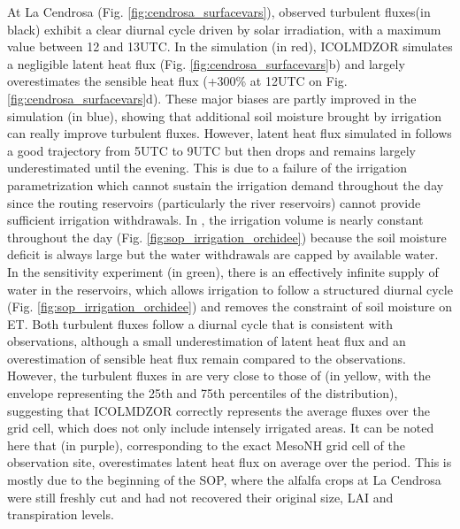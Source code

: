 At La Cendrosa (Fig. \ref{fig:cendrosa_surfacevars}), observed turbulent fluxes(in black) exhibit a clear diurnal cycle driven by solar irradiation, with a maximum value between 12 and 13UTC.
In the \noirr simulation (in red), ICOLMDZOR simulates a negligible latent heat flux (Fig. \ref{fig:cendrosa_surfacevars}b) and largely overestimates the sensible heat flux (+300\% at 12UTC on Fig. \ref{fig:cendrosa_surfacevars}d). 
These major biases are partly improved in the \irr simulation (in blue), showing that additional soil moisture brought by irrigation can really improve turbulent fluxes. However, latent heat flux simulated in \irr follows a good trajectory from 5UTC to 9UTC but then drops and remains largely underestimated until the evening. This is due to a failure of the irrigation parametrization which cannot sustain the irrigation demand throughout the day since the routing reservoirs (particularly the river reservoirs) cannot provide sufficient irrigation withdrawals. In \irr, the irrigation volume is nearly constant throughout the day (Fig. \ref{fig:sop_irrigation_orchidee}) because the soil moisture deficit is always large but the water withdrawals are capped by available water.
In the \irrboost sensitivity experiment (in green), there is an effectively infinite supply of water in the reservoirs, which allows irrigation to follow a structured diurnal cycle (Fig. \ref{fig:sop_irrigation_orchidee}) and removes the constraint of soil moisture on ET. Both turbulent fluxes follow a diurnal cycle that is consistent with observations, although a small underestimation of latent heat flux and an overestimation of sensible heat flux remain compared to the observations. 
However, the turbulent fluxes in \irrboost are very close to those of \mesomean (in yellow, with the envelope representing the 25th and 75th percentiles of the distribution), suggesting that ICOLMDZOR correctly represents the average fluxes over the grid cell, which does not only include intensely irrigated areas.
It can be noted here that \mesoexact (in purple), corresponding to the exact MesoNH grid cell of the observation site, overestimates latent heat flux on average over the period. This is mostly due to the beginning of the SOP, where the alfalfa crops at La Cendrosa were still freshly cut and had not recovered their original size, LAI and transpiration levels.

